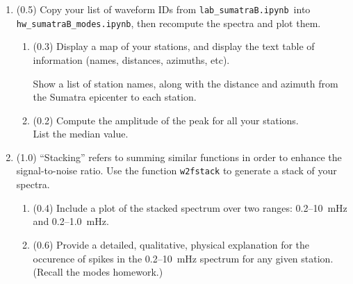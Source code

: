 \documentclass[11pt,titlepage,fleqn]{article}
\newcommand{\tfilemodes}{{\tt hw\_sumatraB\_modes.ipynb}}
\newcommand{\tfilelab}{{\tt lab\_sumatraB.ipynb}}
\begin{document}
\begin{enumerate}

\item (0.5) Copy your list of waveform IDs from \tfilelab\ into \tfilemodes, then recompute the spectra and plot them.
%
\begin{enumerate}
\item (0.3) %
Display a map of your stations, and display the text table of information (names, distances, azimuths, etc).

Show a list of station names, along with the distance and azimuth from the Sumatra epicenter to each station.

\item (0.2) Compute the amplitude of the  peak for all your stations. \\
List the median value.
\end{enumerate}


\item (1.0) ``Stacking'' refers to summing similar functions in order to enhance the signal-to-noise ratio. Use the function \verb+w2fstack+ to generate a stack of your spectra.
%
\begin{enumerate}
\item (0.4) Include a plot of the stacked spectrum over two ranges: 0.2--10~mHz and 0.2--1.0~mHz.
\item (0.6) Provide a detailed, qualitative, physical explanation for the occurence of spikes in the 0.2--10~mHz spectrum for any given station. (Recall the modes homework.)
\end{enumerate}
%



\end{enumerate}
\end{document}
